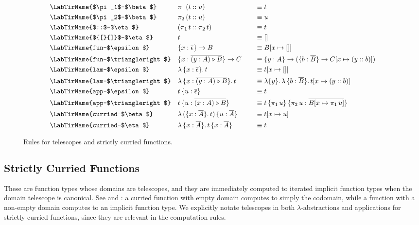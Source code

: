 \documentclass[acmsmall,review,anonymous,prologue,dvipsnames]{acmart}\settopmatter{printfolios=true,printccs=false,printacmref=false}
\newcommand{\TCons}{\triangleright}
\newcommand{\ol}[1]{\overline{#1}}
\theoremstyle{remark}
\begin{document}
\begin{figure}[h]
\begin{alignat*}{3}
  & \text{\LabTirName{$\pi_1$-$\beta$}}\hspace{2em}  && \pi_1\,(t :: u) && \equiv t\\
  & \text{\LabTirName{$\pi_2$-$\beta$}}  && \pi_2\,(t :: u) && \equiv u\\
  & \text{\LabTirName{$::$-$\eta$}}  && (\pi_1\,t :: \pi_2\,t) && \equiv t\\
  & \text{\LabTirName{${[}{]}$-$\eta$}}  && t && \equiv []\\
  & \text{\LabTirName{fun-$\epsilon$}}\hspace{3em} && \{x : \ol{\epsilon}\}\to B && \equiv B[x \mapsto []]\\
  & \text{\LabTirName{fun-$\TCons$}}         && \{x : \ol{(y : A) \TCons B}\}\to C \quad && \equiv
                                               \{y : A\}\to(\{b : \ol{B}\}\to C[x \mapsto (y :: b)])\\
  & \text{\LabTirName{lam-$\epsilon$}}       && \lambda\,\{x : \ol{\epsilon}\}.\,t && \equiv t[x \mapsto []]\\
  & \text{\LabTirName{lam-$\TCons$}}         && \lambda\,\{x : \ol{(y : A)\TCons B}\}.\,t && \equiv
                                         \lambda\{y\}.\,\lambda\,\{b : \ol{B}\}.\,t[x \mapsto (y :: b)]\\
  & \text{\LabTirName{app-$\epsilon$}}       && t\,\{u : \ol{\epsilon}\} && \equiv t\\
  & \text{\LabTirName{app-$\TCons$}}         && t\,\{u : \ol{(x : A) \TCons B}\} &&\equiv
                                         t\,\{\pi_1\,u\}\,\{\pi_2\,u : \ol{B[x \mapsto \pi_1\,u]}\}\\
  & \text{\LabTirName{curried-$\beta$}} && \lambda\,(\{x : \ol{A}\}.\,t)\,\{u:\ol{A}\} &&\equiv
                                                             t[x \mapsto u]\\
  & \text{\LabTirName{curried-$\eta$}}  && \lambda\,\{x : \ol{A}\}.\,t\,\{x : \ol{A}\} && \equiv t
\end{alignat*}

\caption{Rules for telescopes and strictly curried functions.}
\label{fig:telescopes}
\end{figure}


\subsection{Strictly Curried Functions}

These are function types whose domains are telescopes, and they are immediately
computed to iterated implicit function types when the domain telescope is
canonical.  See  and \LabTirName{fun-$\TCons$}: a
curried function with empty domain computes to simply the codomain, while a
function with a non-empty domain computes to an implicit function type. We
explicitly notate telescopes in both $\lambda$-abstractions and applications for
strictly curried functions, since they are relevant in the computation rules.
\end{document}
